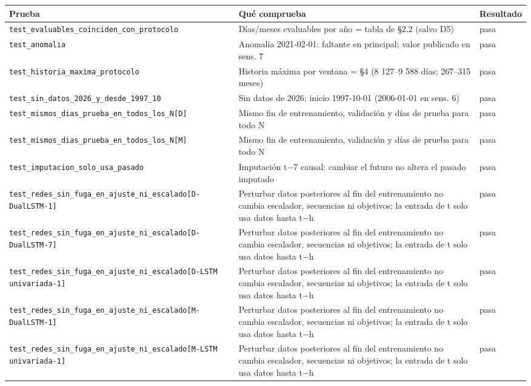 \begin{tabular}{p{5.2cm}p{8cm}l}
\toprule
Prueba & Qué comprueba & Resultado \\
\midrule
\texttt{test\_evaluables\_coinciden\_con\_protocolo} & Días/meses evaluables por año = tabla de §2.2 (salvo D5) & pasa \\
\texttt{test\_anomalia} & Anomalía 2021-02-01: faltante en principal; valor publicado en sens. 7 & pasa \\
\texttt{test\_historia\_maxima\_protocolo} & Historia máxima por ventana = §4 (8 127–9 588 días; 267–315 meses) & pasa \\
\texttt{test\_sin\_datos\_2026\_y\_desde\_1997\_10} & Sin datos de 2026; inicio 1997-10-01 (2006-01-01 en sens. 6) & pasa \\
\texttt{test\_mismos\_dias\_prueba\_en\_todos\_los\_N[D]} & Mismo fin de entrenamiento, validación y días de prueba para todo N & pasa \\
\texttt{test\_mismos\_dias\_prueba\_en\_todos\_los\_N[M]} & Mismo fin de entrenamiento, validación y días de prueba para todo N & pasa \\
\texttt{test\_imputacion\_solo\_usa\_pasado} & Imputación t−7 causal: cambiar el futuro no altera el pasado imputado & pasa \\
\texttt{test\_redes\_sin\_fuga\_en\_ajuste\_ni\_escalado[D-DualLSTM-1]} & Perturbar datos posteriores al fin del entrenamiento no cambia escalador, secuencias ni objetivos; la entrada de t solo usa datos hasta t−h & pasa \\
\texttt{test\_redes\_sin\_fuga\_en\_ajuste\_ni\_escalado[D-DualLSTM-7]} & Perturbar datos posteriores al fin del entrenamiento no cambia escalador, secuencias ni objetivos; la entrada de t solo usa datos hasta t−h & pasa \\
\texttt{test\_redes\_sin\_fuga\_en\_ajuste\_ni\_escalado[D-LSTM univariada-1]} & Perturbar datos posteriores al fin del entrenamiento no cambia escalador, secuencias ni objetivos; la entrada de t solo usa datos hasta t−h & pasa \\
\texttt{test\_redes\_sin\_fuga\_en\_ajuste\_ni\_escalado[M-DualLSTM-1]} & Perturbar datos posteriores al fin del entrenamiento no cambia escalador, secuencias ni objetivos; la entrada de t solo usa datos hasta t−h & pasa \\
\texttt{test\_redes\_sin\_fuga\_en\_ajuste\_ni\_escalado[M-LSTM univariada-1]} & Perturbar datos posteriores al fin del entrenamiento no cambia escalador, secuencias ni objetivos; la entrada de t solo usa datos hasta t−h & pasa \\

\end{tabular}
